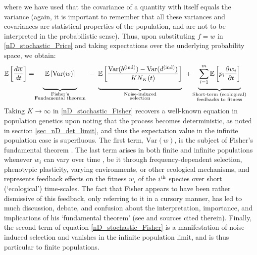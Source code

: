 where we have used that the covariance of a quantity with itself equals the variance (again, it is important to remember that all these variances and covariances are statistical properties of the population, and are not to be interpreted in the probabilistic sense). Thus, upon substituting $f = w$ in \eqref{nD_stochastic_Price} and taking expectations over the underlying probability space, we obtain:
\begin{align}
\label{nD_stochastic_Fisher}
\mathbb{E}\left[\frac{d\overline{w}}{dt}\right] &= 
\negmedspace {\underbrace{\mystrut{4ex} \ \vphantom{ \frac{\textrm{Var}(b^{\textrm{(ind)}}) - \textrm{Var}(d^{\textrm{(ind)}})}{KN_K(t)} } \mathbb{E}\left[\textrm{Var}(w)\right] \ }_{\substack{\text{Fisher's} \\ \text{Fundamental theorem}}}} \ - \ {\underbrace{\mystrut{4ex}\mathbb{E}\left[\frac{\textrm{Var}(b^{\textrm{(ind)}}) - \textrm{Var}(d^{\textrm{(ind)}})}{KN_K(t)}\right]}_{\substack{\text{Noise-induced} \\ \text{selection}}}} \ + {\underbrace{\mystrut{4ex} \vphantom{ \frac{\textrm{Var}(b^{\textrm{(ind)}}) - \textrm{Var}(d^{\textrm{(ind)}})}{KN_K(t)} } \sum\limits_{i=1}^{m}\mathbb{E}\left[p_i\frac{\partial w_i}{\partial t}\right]}_{\substack{\text{Short-term (ecological)} \\ \text{feedbacks to fitness}}}}
\end{align}
Taking $K \to \infty$ in \eqref{nD_stochastic_Fisher} recovers a well-known equation in population genetics upon noting that the process becomes deterministic, as noted in section \ref{sec_nD_det_limit}, and thus the expectation value in the infinite population case is superfluous. The first term, $\textrm{Var}(w)$, is the subject of Fisher's fundamental theorem \citep{price_fishers_1972, frank_fishers_1992, kokko_stagnation_2021}. The last term arises in both finite and infinite populations whenever $w_i$ can vary over time \citep{baez_fundamental_2021}, be it through frequency-dependent selection, phenotypic plasticity, varying environments, or other ecological mechanisms, and represents feedback effects on the fitness $w_i$ of the $i\textsuperscript{th}$ species over short (`ecological') time-scales. The fact that Fisher appears to have been rather dismissive of this feedback, only referring to it in a cursory manner, has led to much discussion, debate, and confusion about the interpretation, importance, and implications of his `fundamental theorem' (see \cite{kokko_stagnation_2021} and sources cited therein). Finally, the second term of equation \eqref{nD_stochastic_Fisher} is a manifestation of noise-induced selection and vanishes in the infinite population limit, and is thus particular to finite populations.\\
